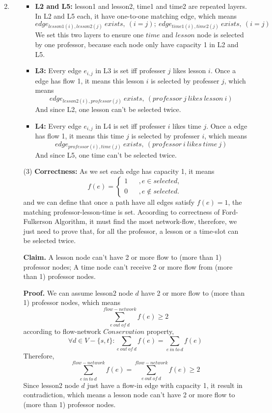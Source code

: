\documentclass[12pt,a4paper]{article}
\makeatletter
\newtheorem*{solution}{Solution}
\theoremstyle{definition}
\renewenvironment{solution}[1][Solution] {\par\pushQED{\qed}\normalfont\topsep6\p@\@plus6\p@\relax\trivlist\item[\hskip\labelsep\bfseries#1\@addpunct{.}]\ignorespaces}{\popQED\endtrivlist\@endpefalse} \makeatother
\makeatother
\begin{document}
\begin{enumerate}
\begin{solution}
\begin{itemize}
\begin{itemize}
\item \textbf{L2 and L5:} lesson1 and lesson2, time1 and time2 are repeated layers. In L2 and L5 each, it have one-to-one matching edge, which means
$$edge_{lesson1(i),lesson2(j)}\ exists,\ (i=j);\ edge_{time1(i),time2(j)}\ exists,\ (i=j)$$
We set this two layers to ensure one $time$ and $lesson$ node is selected by one professor, because each node only have capacity 1 in L2 and L5. 
\item \textbf{L3:} Every edge $e_{i,j}$ in L3 is set iff professer $j$ likes lesson $i$. Once a edge has flow 1, it means this lesson $i$ is selected by professer $j$, which means
$$edge_{lesson2(i),professor(j)}\ exists,\ (professor\ j\ likes\ lesson\ i)$$
And since L2, one lesson can't be selected twice.
\item \textbf{L4:} Every edge $e_{i,j}$ in L4 is set iff professer $i$ likes time $j$. Once a edge has flow 1, it means this time $j$ is selected by professer $i$, which means
$$edge_{professor(i),time(j)}\ exists,\ (professor\ i\ likes\ time\ j)$$
And since L5, one time can't be selected twice.
\end{itemize}
\item [(3)] \textbf{Correctness:} As we set each edge has capacity 1, it means 
$$ f(e)=\left\{
            \begin{array}{rcl}
            1       &      & {,e \in selected,}\\
            0     &      & {,e \notin selected.}
            \end{array} \right. $$
and we can define that once a path have all edges satisfy $f(e)=1$, the matching professor-lesson-time is set. Acoording to correctness of Ford-Fulkerson Algorithm, it must find the most network-flow, therefore, we just need to prove that, for all the professor, a lesson or a time-slot can be selected twice.\par
\textbf{Claim.} A lesson node can't have 2 or more flow to (more than 1) professor nodes; A time node can't receive 2 or more flow from (more than 1) professor nodes.
\par
\textbf{Proof.} We can assume lesson2 node $d$ have 2 or more flow to (more than 1) professor nodes, which means
$$\sum_{e\ out\ of\ d}^{flow-network}f(e) \geq 2$$
according to flow-network $Conservation$ property, 
$$\forall d \in V-\{s,t\}: \sum_{e\ out\ of\ d}f(e) =\sum_{e\ in\ to\ d}f(e)$$  
Therefore,
$$\sum_{e\ in\ to\ d}^{flow-network}f(e)=\sum_{e\ out\ of\ d}^{flow-network}f(e) \geq 2$$
Since lesson2 node $d$ just have a flow-in edge with capacity 1, it result in contradiction, which means a lesson node can't have 2 or more flow to (more than 1) professor nodes.\par

\end{itemize}
\end{solution}
\end{enumerate}
\end{document}
